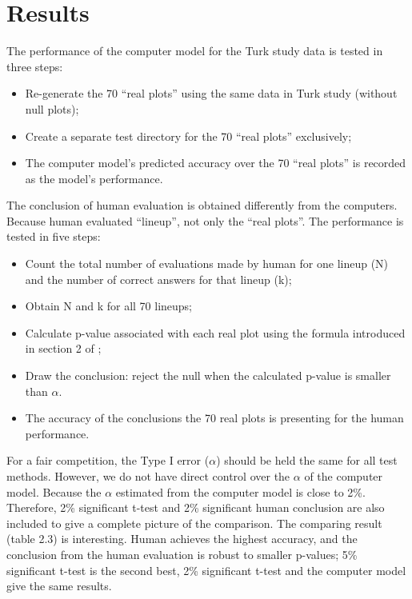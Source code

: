 \documentclass[12pt]{article}
\begin{document}
\section{Results}
\label{sec:results}

The performance of the computer model for the Turk study data is tested
in three steps:

\begin{itemize}
\item
  Re-generate the 70 ``real plots'' using the same data in Turk study
  (without null plots);
\item
  Create a separate test directory for the 70 ``real plots''
  exclusively;
\item
  The computer model's predicted accuracy over the 70 ``real plots'' is
  recorded as the model's performance.
\end{itemize}

The conclusion of human evaluation is obtained differently from the
computers. Because human evaluated ``lineup'', not only the ``real
plots''. The performance is tested in five steps:

\begin{itemize}
\item
  Count the total number of evaluations made by human for one lineup (N)
  and the number of correct answers for that lineup (k);
\item
  Obtain N and k for all 70 lineups;
\item
  Calculate p-value associated with each real plot using the formula
  introduced in section 2 of \citet{MM13};
\item
  Draw the conclusion: reject the null when the calculated p-value is
  smaller than \(\alpha\).
\item
  The accuracy of the conclusions the 70 real plots is presenting for
  the human performance.
\end{itemize}

For a fair competition, the Type I error (\(\alpha\)) should be held the
same for all test methods. However, we do not have direct control over
the \(\alpha\) of the computer model. Because the \(\alpha\) estimated
from the computer model is close to 2\%. Therefore, 2\% significant
t-test and 2\% significant human conclusion are also included to give a
complete picture of the comparison. The comparing result (table 2.3) is
interesting. Human achieves the highest accuracy, and the conclusion
from the human evaluation is robust to smaller p-values; 5\% significant
t-test is the second best, 2\% significant t-test and the computer model
give the same results.
\end{document}
